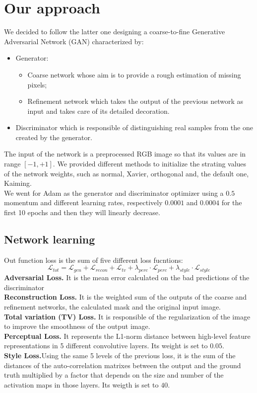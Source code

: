 \documentclass[10pt,twocolumn,letterpaper]{article}
\begin{document}
	\section{Our approach}
	We decided to follow the latter one designing a coarse-to-fine Generative Adversarial Network (GAN) characterized by:
	\begin{itemize}
		\item
		Generator:
		\begin{itemize}
			\item
			Coarse network whose aim is to provide a rough estimation of missing pixels;
			\item
			Refinement network which takes the output of the previous network as input and takes care of its detailed decoration.
		\end{itemize}
		\item
		Discriminator which is responsible of distinguishing real samples from the one created by the generator.
	\end{itemize}
	The input of the network is a preprocessed RGB image so that its values are in range \([-1,+1]\).
	We provided different methods to initialize the strating values of the network weights, such as normal, Xavier, orthogonal and, the default one, Kaiming.
	\\
	We went for Adam as the generator and discriminator optimizer using a \(0.5\) momentum and different learning rates, respectively \(0.0001\) and \(0.0004\) for the first 10 epochs and then they will linearly decrease.
	\subsection{Network learning}
	Out function loss is the sum of five different loss fucntions:
	\begin{equation}
		\mathcal{L}_{tot} = \mathcal{L}_{gen} + \mathcal{L}_{recon} + \mathcal{L}_{tv} + \lambda_{perc} \cdot \mathcal{L}_{perc} + \lambda_{style} \cdot \mathcal{L}_{style}
	\end{equation}
	\textbf{Adversarial Loss.} It is the mean error calculated on the bad predictions of the discriminator
	\\
	\textbf{Reconstruction Loss.} It is the weighted sum of the outputs of the coarse and refinement networks, the calculated mask and the original input image.
	\\
	\textbf{Total variation (TV) Loss.} It is responsible of the regularization of the image to improve the smoothness of the output image.
	\\
	\textbf{Perceptual Loss.} It represents the L1-norm distance between high-level feature representations in 5 different convolutive layers. Its weight is set to \(0.05\).
	\\
	\textbf{Style Loss.}Using the same 5 levels of the previous loss, it is the sum of the distances of the auto-correlation matrixes between the output and the ground truth multiplied by a factor that depends on the size and number of the activation maps in those layers. Its weigth is set to \(40\).
	\\
\end{document}
